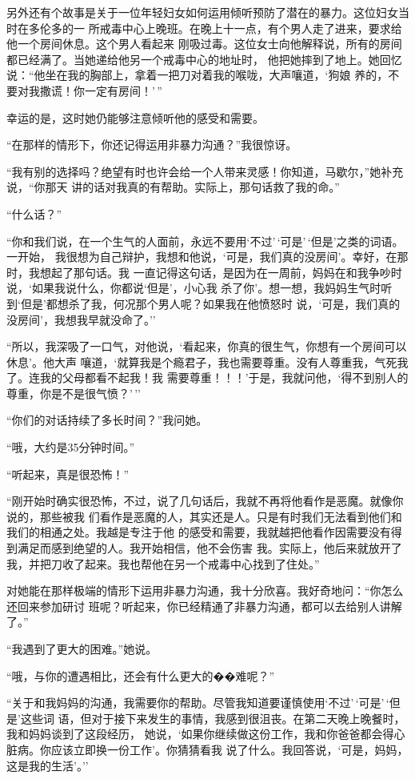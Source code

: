 \documentclass{ctexart}
\begin{document}
另外还有个故事是关于一位年轻妇女如何运用倾听预防了潜在的暴力。这位妇女当时在多伦多的一
所戒毒中心上晚班。在晚上十一点，有个男人走了进来，要求给他一个房间休息。这个男人看起来
刚吸过毒。这位女士向他解释说，所有的房间都已经满了。当她递给他另一个戒毒中心的地址时，
他把她摔到了地上。她回忆说：``他坐在我的胸部上，拿着一把刀对着我的喉咙，大声嚷道，`狗娘
养的，不要对我撒谎！你一定有房间！'\,''

幸运的是，这时她仍能够注意倾听他的感受和需要。

``在那样的情形下，你还记得运用非暴力沟通？''我很惊讶。

``我有别的选择吗？绝望有时也许会给一个人带来灵感！你知道，马歇尔，''她补充说，``你那天
讲的话对我真的有帮助。实际上，那句话救了我的命。''

``什么话？''

``你和我们说，在一个生气的人面前，永远不要用`不过'\,`可是'\,`但是'之类的词语。一开始，
我很想为自己辩护，我想和他说，`可是，我们真的没房间'。幸好，在那时，我想起了那句话。我
一直记得这句话，是因为在一周前，妈妈在和我争吵时说，`如果我说什么，你都说`但是'，小心我
杀了你'。想一想，我妈妈生气时听到`但是'都想杀了我，何况那个男人呢？如果我在他愤怒时
说，`可是，我们真的没房间'，我想我早就没命了。''

``所以，我深吸了一口气，对他说，`看起来，你真的很生气，你想有一个房间可以休息'。他大声
嚷道，`就算我是个瘾君子，我也需要尊重。没有人尊重我，气死我了。连我的父母都看不起我！我
需要尊重！！！'于是，我就问他，`得不到别人的尊重，你是不是很气愤？'\,''

``你们的对话持续了多长时间？''我问她。

``哦，大约是35分钟时间。''

``听起来，真是很恐怖！''

``刚开始时确实很恐怖，不过，说了几句话后，我就不再将他看作是恶魔。就像你说的，那些被我
们看作是恶魔的人，其实还是人。只是有时我们无法看到他们和我们的相通之处。我越是专注于他
的感受和需要，我就越把他看作因需要没有得到满足而感到绝望的人。我开始相信，他不会伤害
我。实际上，他后来就放开了我，并把刀收了起来。我也帮他在另一个戒毒中心找到了住处。''

对她能在那样极端的情形下运用非暴力沟通，我十分欣喜。我好奇地问：``你怎么还回来参加研讨
班呢？听起来，你已经精通了非暴力沟通，都可以去给别人讲解了。''

``我遇到了更大的困难。''她说。

``哦，与你的遭遇相比，还会有什么更大的��难呢？''

``关于和我妈妈的沟通，我需要你的帮助。尽管我知道要谨慎使用`不过'\,`可是'\,`但是'这些词
语，但对于接下来发生的事情，我感到很沮丧。在第二天晚上晚餐时，我和妈妈谈到了这段经历，
她说，`如果你继续做这份工作，我和你爸爸都会得心脏病。你应该立即换一份工作'。你猜猜看我
说了什么。我回答说，`可是，妈妈，这是我的生活'。''
\end{document}
